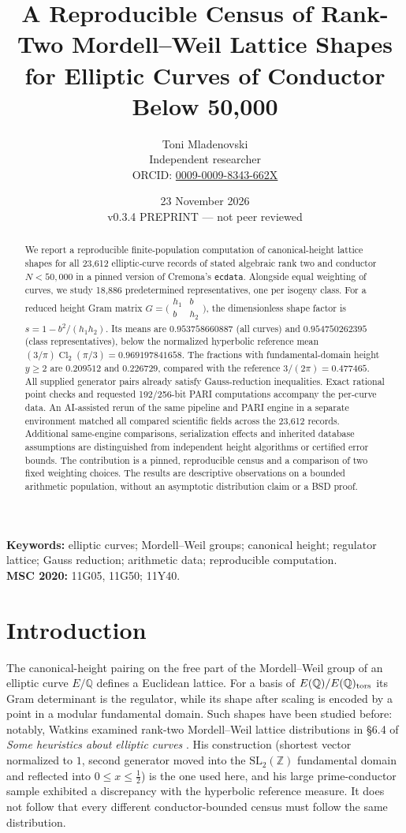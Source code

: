 \documentclass[11pt,a4paper]{article}
\title{A Reproducible Census of Rank-Two Mordell--Weil Lattice Shapes\\for Elliptic Curves of Conductor Below 50,000}
\author{Toni Mladenovski\\\small Independent researcher\\\small ORCID: \href{https://orcid.org/0009-0009-8343-662X}{0009-0009-8343-662X}}
\date{23 November 2026\\\small v0.3.4 PREPRINT --- not peer reviewed}
\newcommand{\Q}{\mathbb{Q}}
\newcommand{\ZZ}{\mathbb{Z}}
\newcommand{\Cl}{\operatorname{Cl}_2}
\begin{document}
\maketitle
\begin{abstract}
We report a reproducible finite-population computation of canonical-height lattice shapes for all 23,612 elliptic-curve records of stated algebraic rank two and conductor $N<50{,}000$ in a pinned version of Cremona's \texttt{ecdata}. Alongside equal weighting of curves, we study 18,886 predetermined representatives, one per isogeny class. For a reduced height Gram matrix $G=\bigl(\begin{smallmatrix}h_1&b\\b&h_2\end{smallmatrix}\bigr)$, the dimensionless shape factor is $s=1-b^2/(h_1h_2)$. Its means are $0.953758660887$ (all curves) and $0.954750262395$ (class representatives), below the normalized hyperbolic reference mean $(3/\pi)\Cl(\pi/3)=0.969197841658$. The fractions with fundamental-domain height $y\ge2$ are $0.209512$ and $0.226729$, compared with the reference $3/(2\pi)=0.477465$. All supplied generator pairs already satisfy Gauss-reduction inequalities. Exact rational point checks and requested 192/256-bit PARI computations accompany the per-curve data. An AI-assisted rerun of the same pipeline and PARI engine in a separate environment matched all compared scientific fields across the 23,612 records. Additional same-engine comparisons, serialization effects and inherited database assumptions are distinguished from independent height algorithms or certified error bounds. The contribution is a pinned, reproducible census and a comparison of two fixed weighting choices. The results are descriptive observations on a bounded arithmetic population, without an asymptotic distribution claim or a BSD proof.
\end{abstract}
\noindent\textbf{Keywords:} elliptic curves; Mordell--Weil groups; canonical height; regulator lattice; Gauss reduction; arithmetic data; reproducible computation.\\
\textbf{MSC 2020:} 11G05, 11G50; 11Y40.

\section{Introduction}
The canonical-height pairing on the free part of the Mordell--Weil group of an elliptic curve $E/\Q$ defines a Euclidean lattice. For a basis of $E(\Q)/E(\Q)_{\rm tors}$ its Gram determinant is the regulator, while its shape after scaling is encoded by a point in a modular fundamental domain. Such shapes have been studied before: notably, Watkins examined rank-two Mordell--Weil lattice distributions in \S6.4 of \emph{Some heuristics about elliptic curves} \cite{Watkins2008}. His construction (shortest vector normalized to $1$, second generator moved into the $\mathrm{SL}_2(\ZZ)$ fundamental domain and reflected into $0\le x\le\frac12$) is the one used here, and his large prime-conductor sample exhibited a discrepancy with the hyperbolic reference measure. It does not follow that every different conductor-bounded census must follow the same distribution.
\end{document}
